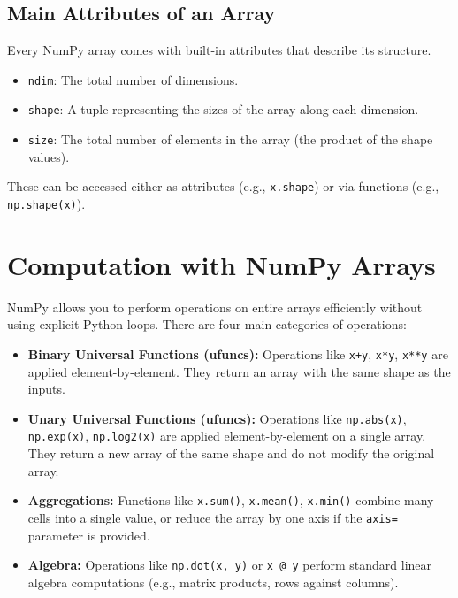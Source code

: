 \subsection{Main Attributes of an Array}
Every NumPy array comes with built-in attributes that describe its structure.
\begin{itemize}
    \item \texttt{ndim}: The total number of dimensions.
    \item \texttt{shape}: A tuple representing the sizes of the array along each dimension.
    \item \texttt{size}: The total number of elements in the array (the product of the shape values).
\end{itemize}
These can be accessed either as attributes (e.g., \texttt{x.shape}) or via functions (e.g., \texttt{np.shape(x)}).





\section{Computation with NumPy Arrays}
NumPy allows you to perform operations on entire arrays efficiently without using explicit Python loops. There are four main categories of operations:

\begin{itemize}
    \item \textbf{Binary Universal Functions (ufuncs):} Operations like \texttt{x+y}, \texttt{x*y}, \texttt{x**y} are applied element-by-element. They return an array with the same shape as the inputs.
    \item \textbf{Unary Universal Functions (ufuncs):} Operations like \texttt{np.abs(x)}, \texttt{np.exp(x)}, \texttt{np.log2(x)} are applied element-by-element on a single array. They return a new array of the same shape and do not modify the original array.
    \item \textbf{Aggregations:} Functions like \texttt{x.sum()}, \texttt{x.mean()}, \texttt{x.min()} combine many cells into a single value, or reduce the array by one axis if the \texttt{axis=} parameter is provided.
    \item \textbf{Algebra:} Operations like \texttt{np.dot(x, y)} or \texttt{x @ y} perform standard linear algebra computations (e.g., matrix products, rows against columns).
\end{itemize}

